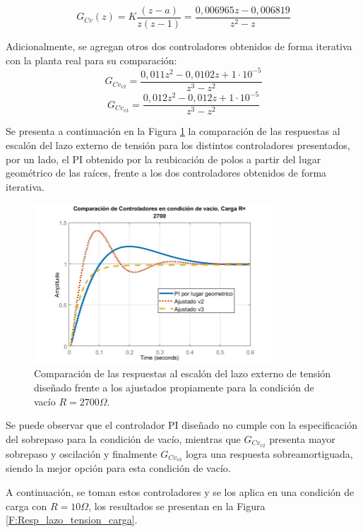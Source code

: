 \begin{equation}
G_{Cv}(z)=K\frac{(z-a)}{z(z-1)}=\frac{0,006965 z - 0,006819}{z^2 - z}
\end{equation} \par 
Adicionalmente, se agregan otros dos controladores obtenidos de forma iterativa con la planta real para su comparación:
\begin{equation}
G_{Cv_{v2}}=\frac{0,011 z^2 - 0,0102 z + 1\cdot 10^{-5}}{z^3 - z^2}
\end{equation}
\begin{equation}
G_{Cv_{v3}}=\frac{0,012 z^2 - 0,012 z + 1\cdot 10^{-5}}{z^3 - z^2}
\end{equation}\par 
Se presenta a continuación en la Figura \ref{F:Resp_lazo_tension_vacio} la comparación de las respuestas al escalón del lazo externo de tensión para los distintos controladores presentados, por un lado, el PI obtenido por la reubicación de polos a partir del lugar geométrico de las raíces, frente a los dos controladores obtenidos de forma iterativa.
\begin{figure} [H]
	\centering
	\includegraphics[width=0.8\textwidth]{./imagenes/Resp_lazo_tension_vacio.jpg}
	\caption{Comparación de las respuestas al escalón del lazo externo de tensión diseñado frente a los ajustados propiamente para la condición de vacío $R=2700\Omega$.}
	\label{F:Resp_lazo_tension_vacio}
\end{figure} \par 
Se puede observar que el controlador PI diseñado no cumple con la especificación del sobrepaso para la condición de vacío, mientras que $G_{Cv_{v2}}$ presenta mayor sobrepaso y oscilación y finalmente $G_{Cv_{v3}}$ logra una respuesta sobreamortiguada, siendo la mejor opción para esta condición de vacío.\par 
A continuación, se toman estos controladores y se los aplica en una condición de carga con $R=10\Omega$, los resultados se presentan en la Figura \ref{F:Resp_lazo_tension_carga}.
